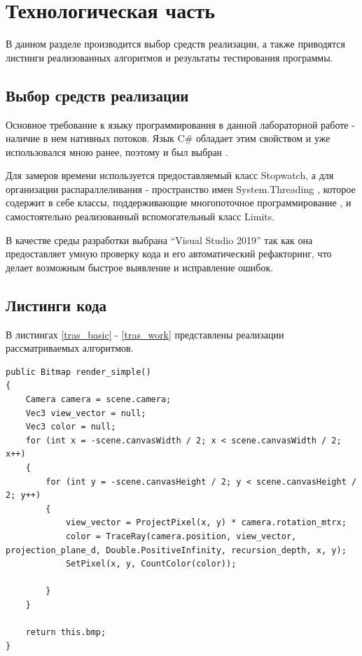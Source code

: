 \chapter{Технологическая часть}

В данном разделе производится выбор средств реализации, а также приводятся листинги реализованных алгоритмов и результаты тестирования программы.


\section{Выбор средств реализации}

Основное требование к языку программирования в данной лабораторной работе - наличие в нем нативных потоков. Язык C\# обладает этим свойством и уже использовался мною ранее, поэтому и был выбран  \cite{CBook}. 

Для замеров времени используется предоставляемый класс Stopwatch, а для организации распараллеливания - пространство имен System.Threading , которое содержит в себе классы, поддерживающие многопоточное программирование \cite{CBook}, и самостоятельно реализованный вспомогательный класс Limits.

В качестве среды разработки выбрана “Visual Studio 2019” так как она предоставляет умную проверку кода и его автоматический рефакторинг, что делает возможным быстрое выявление и исправление ошибок.


\section{Листинги кода}

\lstset{style=sharpc}

В листингах \ref{tras_basic} - \ref{tras_work} представлены реализации рассматриваемых алгоритмов.

\begin{lstlisting}[caption=Реализация  последовательного алгоритма трассировки лучей,
	label={tras_basic}]
public Bitmap render_simple()
{
	Camera camera = scene.camera;
	Vec3 view_vector = null;
	Vec3 color = null;
	for (int x = -scene.canvasWidth / 2; x < scene.canvasWidth / 2; x++)
	{
		for (int y = -scene.canvasHeight / 2; y < scene.canvasHeight / 2; y++)
		{
			view_vector = ProjectPixel(x, y) * camera.rotation_mtrx;
			color = TraceRay(camera.position, view_vector, projection_plane_d, Double.PositiveInfinity, recursion_depth, x, y);
			SetPixel(x, y, CountColor(color));
			
		}
	}
	
	return this.bmp;
}
\end{lstlisting}



